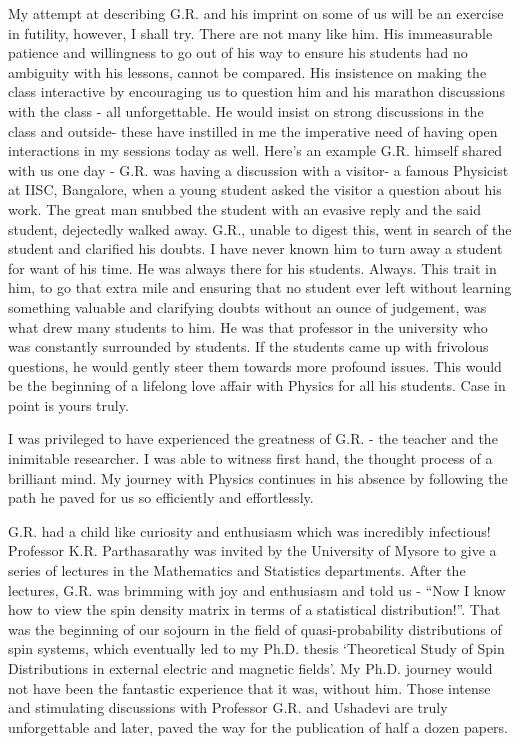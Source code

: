 My attempt at describing G.R. and his imprint on some of us will be an exercise in
futility, however, I shall try. There are not many like him. His immeasurable patience
and willingness to go out of his way to ensure his students had no ambiguity with his
lessons, cannot be compared. His insistence on making the class interactive by encouraging us to question him and his marathon discussions with the class - all unforgettable.
He would insist on strong discussions in the class and outside- these have instilled in
me the imperative need of having open interactions in my sessions today as well. Here’s
an example G.R. himself shared with us one day - G.R. was having a discussion with a
visitor- a famous Physicist at IISC, Bangalore, when a young student asked the visitor a
question about his work. The great man snubbed the student with an evasive reply and
the said student, dejectedly walked away. G.R., unable to digest this, went in search of
the student and clarified his doubts. I have never known him to turn away a student
for want of his time. He was always there for his students. Always. This trait in him,
to go that extra mile and ensuring that no student ever left without learning something
valuable and clarifying doubts without an ounce of judgement, was what drew many
students to him. He was that professor in the university who was constantly surrounded
by students. If the students came up with frivolous questions, he would gently steer
them towards more profound issues. This would be the beginning of a lifelong love affair
with Physics for all his students. Case in point is yours truly.


I was privileged to have experienced the greatness of G.R. - the teacher and the inimitable researcher. I was able to witness first hand, the thought process of a brilliant
mind. My journey with Physics continues in his absence by following the path he paved
for us so efficiently and effortlessly.

G.R. had a child like curiosity and enthusiasm which was incredibly infectious! Professor K.R. Parthasarathy was invited by the University of Mysore to give a series of
lectures in the Mathematics and Statistics departments. After the lectures, G.R. was
brimming with joy and enthusiasm and told us - “Now I know how to view the spin
density matrix in terms of a statistical distribution!”. That was the beginning of our
sojourn in the field of quasi-probability distributions of spin systems, which eventually
led to my Ph.D. thesis `Theoretical Study of Spin Distributions in external electric and
magnetic fields'. My Ph.D. journey would not have been the fantastic experience that it
was, without him. Those intense and stimulating discussions with Professor G.R. and
Ushadevi are truly unforgettable and later, paved the way for the publication of half a
dozen papers.


